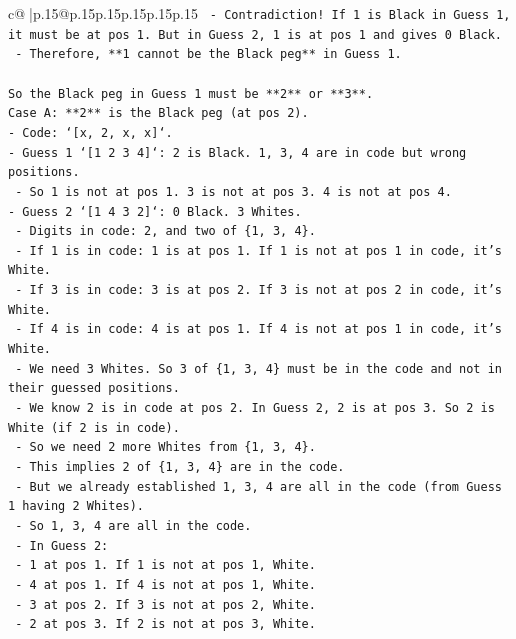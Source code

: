 \documentclass{article}
\begin{document}
{\begin{supertabular}{c@{$\;$}|p{.15\linewidth}@{}p{.15\linewidth}p{.15\linewidth}p{.15\linewidth}p{.15\linewidth}p{.15\linewidth}}
{{{\texttt{  {-} Contradiction! If 1 is Black in Guess 1, it must be at pos 1. But in Guess 2, 1 is at pos 1 and gives 0 Black.} \\
\texttt{  {-} Therefore, **1 cannot be the Black peg** in Guess 1.} \\
\\ 
\texttt{So the Black peg in Guess 1 must be **2** or **3**.} \\
\texttt{Case A: **2** is the Black peg (at pos 2).} \\
\texttt{{-} Code: `{[}x, 2, x, x{]}`.} \\
\texttt{{-} Guess 1 `{[}1 2 3 4{]}`: 2 is Black. 1, 3, 4 are in code but wrong positions.} \\
\texttt{  {-} So 1 is not at pos 1. 3 is not at pos 3. 4 is not at pos 4.} \\
\texttt{{-} Guess 2 `{[}1 4 3 2{]}`: 0 Black. 3 Whites.} \\
\texttt{  {-} Digits in code: 2, and two of \{1, 3, 4\}.} \\
\texttt{  {-} If 1 is in code: 1 is at pos 1. If 1 is not at pos 1 in code, it's White.} \\
\texttt{  {-} If 3 is in code: 3 is at pos 2. If 3 is not at pos 2 in code, it's White.} \\
\texttt{  {-} If 4 is in code: 4 is at pos 1. If 4 is not at pos 1 in code, it's White.} \\
\texttt{  {-} We need 3 Whites. So 3 of \{1, 3, 4\} must be in the code and not in their guessed positions.} \\
\texttt{  {-} We know 2 is in code at pos 2. In Guess 2, 2 is at pos 3. So 2 is White (if 2 is in code).} \\
\texttt{  {-} So we need 2 more Whites from \{1, 3, 4\}.} \\
\texttt{  {-} This implies 2 of \{1, 3, 4\} are in the code.} \\
\texttt{  {-} But we already established 1, 3, 4 are all in the code (from Guess 1 having 2 Whites).} \\
\texttt{  {-} So 1, 3, 4 are all in the code.} \\
\texttt{  {-} In Guess 2:} \\
\texttt{    {-} 1 at pos 1. If 1 is not at pos 1, White.} \\
\texttt{    {-} 4 at pos 1. If 4 is not at pos 1, White.} \\
\texttt{    {-} 3 at pos 2. If 3 is not at pos 2, White.} \\
\texttt{    {-} 2 at pos 3. If 2 is not at pos 3, White.} \\
}}}
\end{supertabular}}
\end{document}
